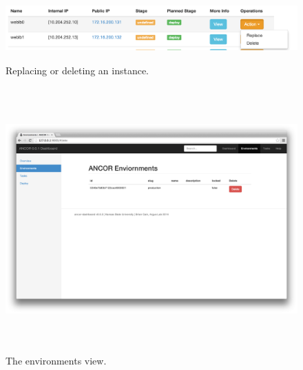\begin{figure}[htb]%

    \includegraphics[height=1.0in]{figures/instance-replace-delete.png}

    \caption[Replacing or deleting an instance.
    ]{Replacing or deleting an instance.}

    \label{replaceDeleteInstance}
\end{figure}

\begin{figure}[htb]%

    \includegraphics[height=4.0in]{figures/environments.png}

    \caption[Environments view.
    ]{The environments view.}

    \label{envView}
\end{figure}

